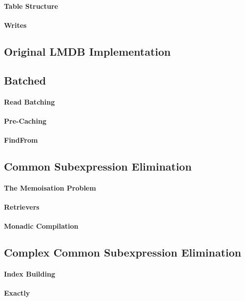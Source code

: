\documentclass[12pt,a4paper,twoside,openright]{report}
\begin{document}
{		\paragraph{Table Structure}
		\paragraph{Writes}
	\subsection{Original LMDB Implementation}
	\subsection{Batched}
		\paragraph{Read Batching}
		\paragraph{Pre-Caching}
		\paragraph{FindFrom}
	\subsection{Common Subexpression Elimination}
		\paragraph{The Memoisation Problem}
		\paragraph{Retrievers}
		\paragraph{Monadic Compilation}
	\subsection{Complex Common Subexpression Elimination}
		\paragraph{Index Building}
		\paragraph{Exactly}
}
\end{document}
